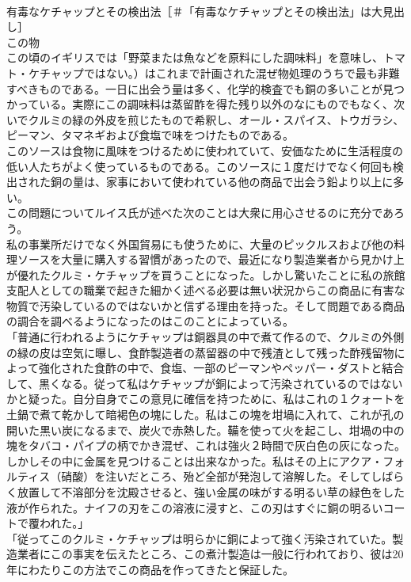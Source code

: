 \documentclass[8pt]{extreport}
\begin{document}
\begin{CJK}{UTF8}{min}
\\	有毒なケチャップとその検出法［＃「有毒なケチャップとその検出法」は大見出し］
\\	この物
\\	この頃のイギリスでは「野菜または魚などを原料にした調味料」を意味し、トマト・ケチャップではない。）はこれまで計画された混ぜ物処理のうちで最も非難すべきものである。一日に出会う量は多く、化学的検査でも銅の多いことが見つかっている。実際にこの調味料は蒸留酢を得た残り以外のなにものでもなく、次いでクルミの緑の外皮を煎じたもので希釈し、オール・スパイス、トウガラシ、ピーマン、タマネギおよび食塩で味をつけたものである。
\\	このソースは食物に風味をつけるために使われていて、安価なために生活程度の低い人たちがよく使っているものである。このソースに１度だけでなく何回も検出された銅の量は、家事において使われている他の商品で出会う鉛より以上に多い。
\\	この問題についてルイス氏が述べた次のことは大衆に用心させるのに充分であろう。
\\	私の事業所だけでなく外国貿易にも使うために、大量のピックルスおよび他の料理ソースを大量に購入する習慣があったので、最近になり製造業者から見かけ上が優れたクルミ・ケチャップを買うことになった。しかし驚いたことに私の旅館支配人としての職業で起きた細かく述べる必要は無い状況からこの商品に有害な物質で汚染しているのではないかと信ずる理由を持った。そして問題である商品の調合を調べるようになったのはこのことによっている。
\\	「普通に行われるようにケチャップは銅器具の中で煮て作るので、クルミの外側の緑の皮は空気に曝し、食酢製造者の蒸留器の中で残渣として残った酢残留物によって強化された食酢の中で、食塩、一部のピーマンやペッパー・ダストと結合して、黒くなる。従って私はケチャップが銅によって汚染されているのではないかと疑った。自分自身でこの意見に確信を持つために、私はこれの１クォートを土鍋で煮て乾かして暗褐色の塊にした。私はこの塊を坩堝に入れて、これが孔の開いた黒い炭になるまで、炭火で赤熱した。鞴を使って火を起こし、坩堝の中の塊をタバコ・パイプの柄でかき混ぜ、これは強火２時間で灰白色の灰になった。しかしその中に金属を見つけることは出来なかった。私はその上にアクア・フォルティス（硝酸）を注いだところ、殆ど全部が発泡して溶解した。そしてしばらく放置して不溶部分を沈殿させると、強い金属の味がする明るい草の緑色をした液が作られた。ナイフの刃をこの溶液に浸すと、この刃はすぐに銅の明るいコートで覆われた。」
\\	「従ってこのクルミ・ケチャップは明らかに銅によって強く汚染されていた。製造業者にこの事実を伝えたところ、この煮汁製造は一般に行われており、彼は20年にわたりこの方法でこの商品を作ってきたと保証した。

\end{CJK}
\end{document}

